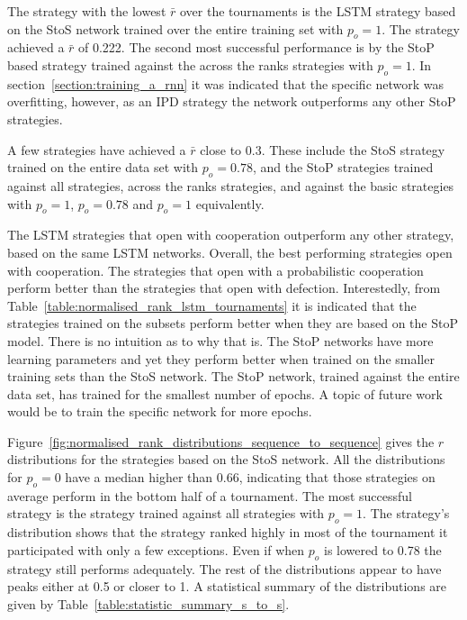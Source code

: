 The strategy with the lowest \(\bar{r}\) over the \metatournamentslstm
tournaments is the LSTM strategy based on the StoS network trained over the entire
training set with \(p_o=1\). The strategy achieved a \(\bar{r}\) of 0.222. The
second most successful performance is by the StoP based strategy trained against
the across the ranks strategies with \(p_o=1\). In
section~\ref{section:training_a_rnn} it was indicated that the specific network
was overfitting, however, as an IPD strategy the network outperforms any other
StoP strategies.

A few strategies have achieved a \(\bar{r}\)
close to 0.3. These include the StoS strategy trained on the entire data set
with \(p_o=0.78\), and the StoP strategies trained against all strategies,
across the ranks strategies, and against the basic strategies with \(p_o=1\),
\(p_o=0.78\) and \(p_o=1\) equivalently.

The LSTM strategies that open with cooperation outperform any other strategy,
based on the same LSTM networks. Overall, the best performing
strategies open with cooperation. The strategies that open with a probabilistic
cooperation perform better than the strategies that open with defection.
Interestedly, from Table~\ref{table:normalised_rank_lstm_tournaments} it is
indicated that the strategies trained on the subsets perform better when they
are based on the StoP model. There is no intuition as to why that is. The
StoP networks have more learning parameters and yet they perform better when
trained on the smaller training sets than the StoS network. The StoP
network, trained against the entire data set, has trained for the smallest
number of epochs. A topic of future work would be to train the specific network
for more epochs.

Figure~\ref{fig:normalised_rank_distributions_sequence_to_sequence} gives the
\(r\) distributions for the strategies based on the StoS network. All the
distributions for \(p_o=0\) have a median higher than 0.66, indicating that
those strategies on average perform in the bottom half of a tournament. The most
successful strategy is the strategy trained against all strategies with
\(p_o=1\). The strategy's distribution shows that the strategy ranked highly in
most of the tournament it participated with only a few exceptions. Even if when
\(p_o\) is lowered to 0.78 the strategy still performs adequately. The rest
of the distributions appear to have peaks either at 0.5 or closer to 1. A
statistical summary of the distributions are given by
Table~\ref{table:statistic_summary_s_to_s}.

